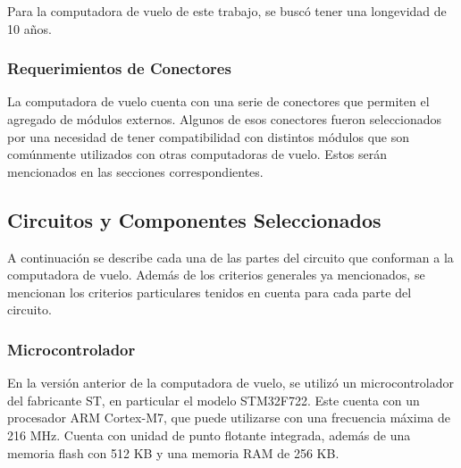Para la computadora de vuelo de este trabajo, se buscó tener una longevidad de 10 años.


\subsubsection{Requerimientos de Conectores}

La computadora de vuelo cuenta con una serie de conectores que permiten el agregado de módulos externos. Algunos de esos conectores fueron seleccionados por una necesidad de tener compatibilidad con distintos módulos que son comúnmente utilizados con otras computadoras de vuelo. Estos serán mencionados en las secciones correspondientes.

\subsection{Circuitos y Componentes Seleccionados}

A continuación se describe cada una de las partes del circuito que conforman a la computadora de vuelo. Además de los criterios generales ya mencionados, se mencionan los criterios particulares tenidos en cuenta para cada parte del circuito.

\subsubsection{Microcontrolador}



En la versión anterior de la computadora de vuelo, se utilizó un microcontrolador del fabricante ST, en particular el modelo STM32F722. Este cuenta con un procesador ARM Cortex-M7, que puede utilizarse con una frecuencia máxima de 216 MHz. Cuenta con unidad de punto flotante integrada, además de una memoria flash con 512 KB y una memoria RAM de 256 KB.

